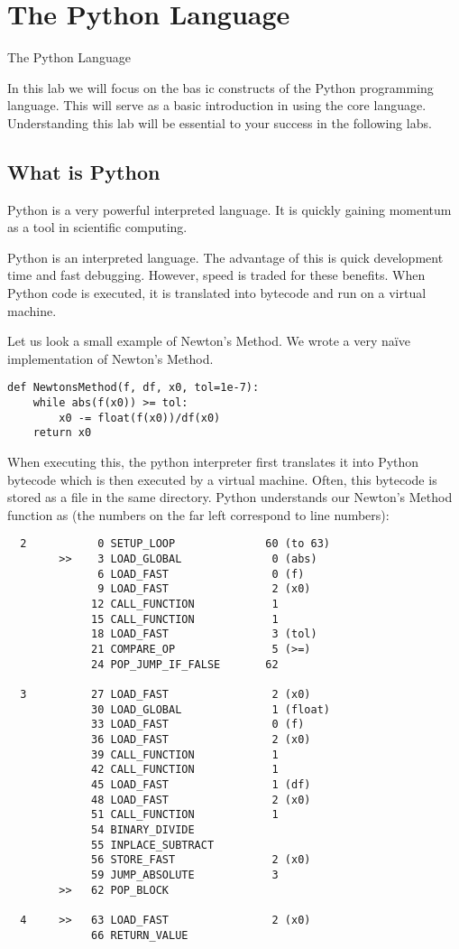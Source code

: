 \chapter{The Python Language}{The Python Language}
\label{Lab:Python}

In this lab we will focus on the bas ic constructs of the Python programming language.  This will serve as a basic introduction in using the core language.  Understanding this lab will be essential to your success in the following labs.

\section*{What is Python}
Python is a very powerful interpreted language.  It is quickly gaining momentum as a tool in scientific computing.

Python is an interpreted language.  The advantage of this is quick development time and fast debugging.  However, speed is traded for these benefits.  When Python code is executed, it is translated into bytecode and run on a virtual machine.

Let us look a small example of Newton's Method.  We wrote a very na\"ive implementation of Newton's Method.
\begin{lstlisting}[style=python]
def NewtonsMethod(f, df, x0, tol=1e-7):
    while abs(f(x0)) >= tol:
        x0 -= float(f(x0))/df(x0)
    return x0
\end{lstlisting}
When executing this, the python interpreter first translates it into Python bytecode which is then executed by a virtual machine.  Often, this bytecode is stored as a  file in the same directory.  Python understands our Newton's Method function as (the numbers on the far left correspond to line numbers):
\begin{verbatim}
  2           0 SETUP_LOOP              60 (to 63)
        >>    3 LOAD_GLOBAL              0 (abs)
              6 LOAD_FAST                0 (f)
              9 LOAD_FAST                2 (x0)
             12 CALL_FUNCTION            1
             15 CALL_FUNCTION            1
             18 LOAD_FAST                3 (tol)
             21 COMPARE_OP               5 (>=)
             24 POP_JUMP_IF_FALSE       62

  3          27 LOAD_FAST                2 (x0)
             30 LOAD_GLOBAL              1 (float)
             33 LOAD_FAST                0 (f)
             36 LOAD_FAST                2 (x0)
             39 CALL_FUNCTION            1
             42 CALL_FUNCTION            1
             45 LOAD_FAST                1 (df)
             48 LOAD_FAST                2 (x0)
             51 CALL_FUNCTION            1
             54 BINARY_DIVIDE       
             55 INPLACE_SUBTRACT    
             56 STORE_FAST               2 (x0)
             59 JUMP_ABSOLUTE            3
        >>   62 POP_BLOCK           

  4     >>   63 LOAD_FAST                2 (x0)
             66 RETURN_VALUE
\end{verbatim}

